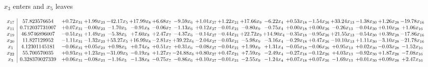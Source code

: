 \documentclass[9pt]{article}
\begin{document}
 $ x_{3} $ enters and $ x_{5} $ leaves 

 \[\begin{array}{c| c c@{\hskip 2pt} c@{\hskip 2pt} c@{\hskip 2pt} c@{\hskip 2pt} c@{\hskip 2pt} c@{\hskip 2pt} c@{\hskip 2pt} c@{\hskip 2pt} c@{\hskip 2pt} c@{\hskip 2pt} c@{\hskip 2pt} c@{\hskip 2pt} c@{\hskip 2pt} c@{\hskip 2pt} c@{\hskip 2pt} c@{\hskip 2pt} }
 x_{17}   &  57.823576654 & +  0.72 x_{31} & +  1.99 x_{23} & -42.17 x_{5} & + 17.99 x_{8} & +  6.68 x_{7} & -9.59 x_{6} & +  1.01 x_{27} & +  1.22 x_{21} & + 17.66 x_{9} & -6.22 x_{4} & +  0.53 x_{18} & -1.54 x_{26} & + 33.24 x_{13} & -1.38 x_{30} & +  1.26 x_{28} & -19.78 x_{16}\\
 x_{11}   &  0.712037731007 & +  0.07 x_{31} & -0.00 x_{23} & -1.70 x_{5} & -0.91 x_{8} & -0.06 x_{7} & -1.13 x_{6} & +  0.12 x_{27} & -0.01 x_{21} & -0.80 x_{9} & -0.75 x_{4} & +  0.00 x_{18} & +  0.00 x_{26} & -0.26 x_{13} & -0.04 x_{30} & +  0.10 x_{28} & +  1.06 x_{16}\\
 x_{19}   &  46.9746896007 & -0.51 x_{31} & +  1.49 x_{23} & -5.38 x_{5} & +  7.60 x_{8} & +  2.47 x_{7} & -4.37 x_{6} & -0.14 x_{27} & -0.44 x_{21} & + 22.72 x_{9} & + 14.90 x_{4} & -0.35 x_{18} & -0.95 x_{26} & + 21.55 x_{13} & -0.54 x_{30} & +  0.39 x_{28} & -17.86 x_{16}\\
 x_{20}   &  11.827129952 & -1.11 x_{31} & -1.32 x_{23} & + 53.27 x_{5} & + 16.99 x_{8} & -2.81 x_{7} & + 39.22 x_{6} & -2.04 x_{27} & -0.03 x_{21} & -5.98 x_{9} & -3.16 x_{4} & -0.29 x_{18} & +  0.47 x_{26} & -10.10 x_{13} & +  1.11 x_{30} & -3.10 x_{28} & -21.78 x_{16}\\
 x_{1}   &  4.12301145181 & -0.06 x_{31} & +  0.05 x_{23} & +  0.98 x_{5} & +  0.74 x_{8} & +  0.51 x_{7} & +  0.31 x_{6} & -0.08 x_{27} & -0.04 x_{21} & +  1.99 x_{9} & +  1.31 x_{4} & -0.05 x_{18} & -0.06 x_{26} & +  0.95 x_{13} & +  0.02 x_{30} & -0.03 x_{28} & -1.52 x_{16}\\
 x_{22}   &  55.700570035 & +  0.93 x_{31} & +  1.23 x_{23} & -31.09 x_{5} & -0.19 x_{8} & +  1.27 x_{7} & -24.88 x_{6} & +  0.80 x_{27} & +  0.47 x_{21} & +  7.59 x_{9} & -2.49 x_{4} & -0.27 x_{18} & -0.12 x_{26} & +  4.03 x_{13} & -0.92 x_{30} & +  1.87 x_{28} & -7.08 x_{16}\\
 x_{3}   &  0.328370027339 & +  0.06 x_{31} & -0.08 x_{23} & -1.16 x_{5} & -1.38 x_{8} & -0.75 x_{7} & -0.86 x_{6} & +  0.10 x_{27} & -0.01 x_{21} & -2.55 x_{9} & -1.24 x_{4} & +  0.07 x_{18} & +  0.07 x_{26} & -1.69 x_{13} & +  0.01 x_{30} & +  0.09 x_{28} & +  2.47 x_{16}\\

\end{array}\]
\end{document}

